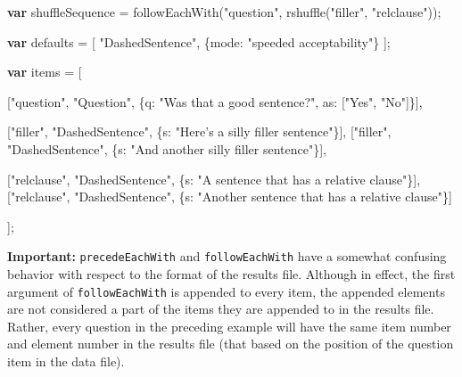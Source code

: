 \documentclass[]{article}
\newenvironment{Shaded}{}{}
\newcommand{\KeywordTok}[1]{\textcolor[rgb]{0.00,0.44,0.13}{\textbf{{#1}}}}
\newcommand{\DataTypeTok}[1]{\textcolor[rgb]{0.56,0.13,0.00}{{#1}}}
\newcommand{\StringTok}[1]{\textcolor[rgb]{0.25,0.44,0.63}{{#1}}}
\newcommand{\FunctionTok}[1]{\textcolor[rgb]{0.02,0.16,0.49}{{#1}}}
\newcommand{\NormalTok}[1]{{#1}}
\begin{document}
\begin{Shaded}
\begin{Highlighting}[]
    \KeywordTok{var} \NormalTok{shuffleSequence = }\FunctionTok{followEachWith}\NormalTok{(}\StringTok{"question"}\NormalTok{, }\FunctionTok{rshuffle}\NormalTok{(}\StringTok{"filler"}\NormalTok{, }\StringTok{"relclause"}\NormalTok{));}

    \KeywordTok{var} \NormalTok{defaults = [}
        \StringTok{"DashedSentence"}\NormalTok{, \{}\DataTypeTok{mode}\NormalTok{: }\StringTok{"speeded acceptability"}\NormalTok{\}}
    \NormalTok{];}

    \KeywordTok{var} \NormalTok{items = [}

    \NormalTok{[}\StringTok{"question"}\NormalTok{, }\StringTok{"Question"}\NormalTok{, \{}\DataTypeTok{q}\NormalTok{: }\StringTok{"Was that a good sentence?"}\NormalTok{, }\DataTypeTok{as}\NormalTok{: [}\StringTok{"Yes"}\NormalTok{, }\StringTok{"No"}\NormalTok{]\}],}

    \NormalTok{[}\StringTok{"filler"}\NormalTok{, }\StringTok{"DashedSentence"}\NormalTok{, \{}\DataTypeTok{s}\NormalTok{: }\StringTok{"Here's a silly filler sentence"}\NormalTok{\}],}
    \NormalTok{[}\StringTok{"filler"}\NormalTok{, }\StringTok{"DashedSentence"}\NormalTok{, \{}\DataTypeTok{s}\NormalTok{: }\StringTok{"And another silly filler sentence"}\NormalTok{\}],}

    \NormalTok{[}\StringTok{"relclause"}\NormalTok{, }\StringTok{"DashedSentence"}\NormalTok{, \{}\DataTypeTok{s}\NormalTok{: }\StringTok{"A sentence that has a relative clause"}\NormalTok{\}],}
    \NormalTok{[}\StringTok{"relclause"}\NormalTok{, }\StringTok{"DashedSentence"}\NormalTok{, \{}\DataTypeTok{s}\NormalTok{: }\StringTok{"Another sentence that has a relative clause"}\NormalTok{\}]}

    \NormalTok{];}
\end{Highlighting}
\end{Shaded}

\textbf{Important:} \texttt{precedeEachWith} and \texttt{followEachWith}
have a somewhat confusing behavior with respect to the format of the
results file. Although in effect, the first argument of
\texttt{followEachWith} is appended to every item, the appended elements
are not considered a part of the items they are appended to in the
results file. Rather, every question in the preceding example will have
the same item number and element number in the results file (that based
on the position of the question item in the data file).
\end{document}
